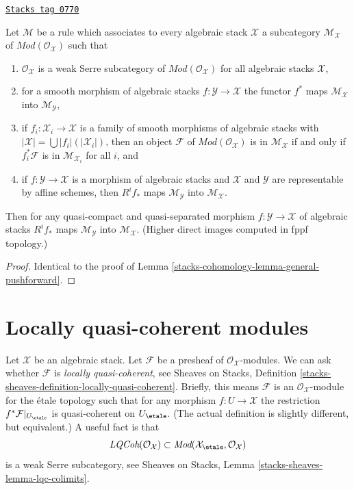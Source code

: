 \begin{lemma}
\label{stacks-cohomology-lemma-general-pushforward-fppf}
\href{https://stacks.math.columbia.edu/tag/0770}{\texttt{Stacks tag 0770}}

Let $\mathcal{M}$ be a rule which associates to every algebraic stack
$\mathcal{X}$ a subcategory $\mathcal{M}_\mathcal{X}$ of
$\textit{Mod}(\mathcal{O}_\mathcal{X})$
such that
\begin{enumerate}
\item $\mathcal{O}_\mathcal{X}$ is a weak Serre subcategory
of $\textit{Mod}(\mathcal{O}_\mathcal{X})$
for all algebraic stacks $\mathcal{X}$,
\item for a smooth morphism of algebraic stacks
$f : \mathcal{Y} \to \mathcal{X}$ the functor $f^*$ maps
$\mathcal{M}_\mathcal{X}$ into $\mathcal{M}_\mathcal{Y}$,
\item if $f_i : \mathcal{X}_i \to \mathcal{X}$ is a family of smooth
morphisms of algebraic stacks with
$|\mathcal{X}| = \bigcup |f_i|(|\mathcal{X}_i|)$, then an object
$\mathcal{F}$ of $\textit{Mod}(\mathcal{O}_\mathcal{X})$
is in $\mathcal{M}_\mathcal{X}$ if and only if
$f_i^*\mathcal{F}$ is in $\mathcal{M}_{\mathcal{X}_i}$ for all $i$, and
\item if $f : \mathcal{Y} \to \mathcal{X}$ is a morphism of algebraic
stacks and $\mathcal{X}$ and $\mathcal{Y}$ are representable
by affine schemes, then $R^if_*$ maps $\mathcal{M}_\mathcal{Y}$
into $\mathcal{M}_\mathcal{X}$.
\end{enumerate}
Then for any quasi-compact and quasi-separated morphism
$f : \mathcal{Y} \to \mathcal{X}$ of algebraic stacks
$R^if_*$ maps $\mathcal{M}_\mathcal{Y}$
into $\mathcal{M}_\mathcal{X}$. (Higher direct images computed in fppf
topology.)
\end{lemma}

\begin{proof}
Identical to the proof of Lemma \ref{stacks-cohomology-lemma-general-pushforward}.
\end{proof}

\section{Locally quasi-coherent modules}
\label{stacks-cohomology-section-locally-quasi-coherent}
Let $\mathcal{X}$ be an algebraic stack. Let $\mathcal{F}$ be a presheaf
of $\mathcal{O}_\mathcal{X}$-modules. We can ask whether $\mathcal{F}$
is {\it locally quasi-coherent}, see
Sheaves on Stacks, Definition
\ref{stacks-sheaves-definition-locally-quasi-coherent}.
Briefly, this means $\mathcal{F}$ is an $\mathcal{O}_\mathcal{X}$-module
for the \'etale topology such that for any morphism $f : U \to \mathcal{X}$
the restriction $f^*\mathcal{F}|_{U_\etale}$ is quasi-coherent
on $U_\etale$. (The actual definition is slightly different, but
equivalent.) A useful fact is that
$$
\textit{LQCoh}(\mathcal{O}_\mathcal{X}) \subset
\textit{Mod}(\mathcal{X}_\etale, \mathcal{O}_\mathcal{X})
$$
is a weak Serre subcategory, see
Sheaves on Stacks, Lemma \ref{stacks-sheaves-lemma-lqc-colimits}.

